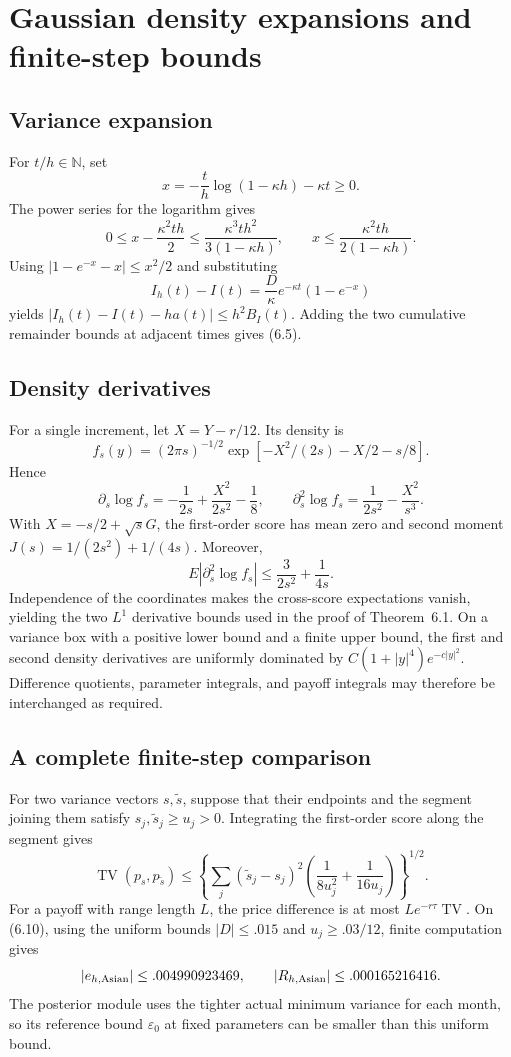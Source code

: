 \documentclass[11pt,a4paper]{article}
\begin{document}
\section{Gaussian density expansions and finite-step bounds}

\subsection{Variance expansion}

For \(t/h\in\mathbb N\), set
\[
x=-\frac th\log(1-\kappa h)-\kappa t\ge0.
\]
The power series for the logarithm gives
\[
0\le x-\frac{\kappa^2th}{2}
\le\frac{\kappa^3th^2}{3(1-\kappa h)},\qquad
x\le\frac{\kappa^2th}{2(1-\kappa h)}.
\]
Using \(|1-e^{-x}-x|\le x^2/2\) and substituting
\[
I_h(t)-I(t)=\frac D\kappa e^{-\kappa t}(1-e^{-x})
\]
yields \(|I_h(t)-I(t)-ha(t)|\le h^2B_I(t)\).
Adding the two cumulative remainder bounds at adjacent times gives (6.5).

\subsection{Density derivatives}

For a single increment, let \(X=Y-r/12\). Its density is
\[
f_s(y)=(2\pi s)^{-1/2}
\exp[-X^2/(2s)-X/2-s/8].
\]
Hence
\[
\partial_s\log f_s=-\frac1{2s}+\frac{X^2}{2s^2}-\frac18,\qquad
\partial_s^2\log f_s=\frac1{2s^2}-\frac{X^2}{s^3}.
\]
With \(X=-s/2+\sqrt{s}G\), the first-order score has mean zero and second moment
\(J(s)=1/(2s^2)+1/(4s)\). Moreover,
\[
E|\partial_s^2\log f_s|
\le\frac3{2s^2}+\frac1{4s}.
\]
Independence of the coordinates makes the cross-score expectations vanish, yielding
the two \(L^1\) derivative bounds used in the proof of Theorem~6.1.
On a variance box with a positive lower bound and a finite upper bound, the first and
second density derivatives are uniformly dominated by
\(C(1+|y|^4)e^{-c|y|^2}\).
Difference quotients, parameter integrals, and payoff integrals may therefore be
interchanged as required.

\subsection{A complete finite-step comparison}

For two variance vectors \(s,\tilde s\), suppose that their endpoints and the segment
joining them satisfy \(s_j,\tilde s_j\ge u_j>0\).
Integrating the first-order score along the segment gives
\[
\operatorname{TV}(p_s,p_{\tilde s})
\le\left\{
\sum_j(\tilde s_j-s_j)^2
\left(\frac1{8u_j^2}+\frac1{16u_j}\right)
\right\}^{1/2}.
\tag{D.1}
\]
For a payoff with range length \(L\), the price difference is at most
\(Le^{-r\tau}\operatorname{TV}\).
On (6.10), using the uniform bounds \(|D|\le.015\) and \(u_j\ge.03/12\),
finite computation gives
\[
|e_{h,\rm Asian}|\le.004990923469,\qquad
|R_{h,\rm Asian}|\le.000165216416.
\]
The posterior module uses the tighter actual minimum variance for each month, so its
reference bound \(\varepsilon_0\) at fixed parameters can be smaller than this uniform bound.
\end{document}
